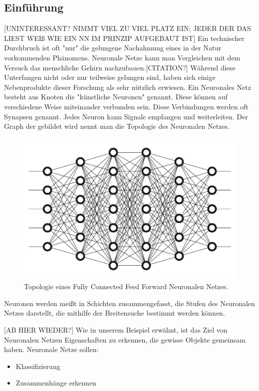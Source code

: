 \documentclass{thesisclass}
\begin{document}
	\subsection{Einführung}
		[UNINTERESSANT? NIMMT VIEL ZU VIEL PLATZ EIN; JEDER DER DAS LIEST WEIß WIE EIN NN IM PRINZIP AUFGEBAUT IST]
Ein technischer Durchbruch ist oft "nur" die gelungene Nachahmung eines in der Natur vorkommenden Phänomens. Neuronale Netze kann man Vergleichen mit dem Versuch das menschliche Gehirn nachzubauen.[CITATION?] Während diese Unterfangen nicht oder nur teilweise gelungen sind, haben sich einige Nebenprodukte dieser Forschung als sehr nützlich erwiesen.
Ein Neuronales Netz besteht aus Knoten die "künstliche Neuronen" genannt. Diese können auf verschiedene Weise miteinander verbunden sein. Diese Verbindungen werden oft Synapsen genannt. Jedes Neuron kann Signale empfangen und weiterleiten. Der Graph der gebildet wird nennt man die Topologie des Neuronalen Netzes.

\begin{figure}[H]
  		\includegraphics[width=\linewidth]{images/DeepNeuralNetwork.jpg}
  		\caption{Topologie eines Fully Connected Feed Forward Neuronalen Netzes. 	\cite{NeuronalesNetzImage} }
  		\label{fig:Neuronales Netz}
\end{figure}

Neuronen werden meißt in Schichten zusammengefasst, die Stufen des Neuronalen Netzes darstellt, die mithilfe der Breitensuche bestimmt werden können.

[AB HIER WIEDER?]
Wie in unserem Beispiel erwähnt, ist das Ziel von Neuronalen Netzen Eigenschaften zu erkennen, die gewisse Objekte gemeinsam haben. Neuronale Netze sollen:
\begin{itemize}
	\item Klassifizierung
	\item Zusammenhänge erkennen
\end{itemize}
\end{document}
